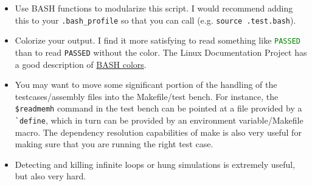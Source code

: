 \documentclass[dvipsnames]{article}
\begin{document}
\begin{itemize}
	\item Use BASH functions to modularize this script. I would recommend adding
		this to your \texttt{.bash\_profile} so that you can call (e.g.
		\texttt{source .test.bash}).
	\item Colorize your output. I find it more satisfying to read something like
		\textcolor{Green}{\texttt{PASSED}} than to read \texttt{PASSED} without the
		color. The Linux Documentation Project has a good description of 
		\href{http://www.tldp.org/HOWTO/Bash-Prompt-HOWTO/x329.html}{BASH colors}.
	\item You may want to move some significant portion of the handling of the
		testcases/assembly files into the Makefile/test bench. For instance, the 
		\texttt{\$readmemh} command in the test bench can be pointed at a file
		provided by a \texttt{\`{}define}, which in turn can be provided by an
		environment variable/Makefile macro. The dependency resolution
		capabilities of make is also very useful for making sure that you are
		running the right test case.
	\item Detecting and killing infinite loops or hung simulations is extremely
		useful, but also very hard. 
\end{itemize}
\end{document}
